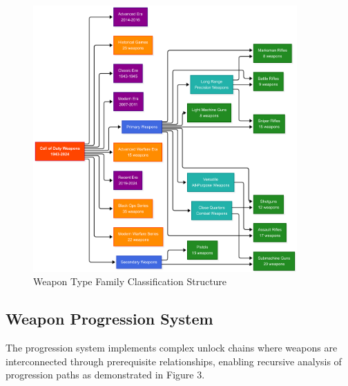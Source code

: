 \documentclass[12pt,a4paper]{article}
\begin{document}
\begin{figure}[H]
    \centering
    \includegraphics[width=0.9\textwidth]{../diagrams/weapon-type-family-classification-vertical.png}
    \caption{Weapon Type Family Classification Structure}
\end{figure}

\subsection{Weapon Progression System}

The progression system implements complex unlock chains where weapons are interconnected through prerequisite relationships, enabling recursive analysis of progression paths as demonstrated in Figure 3.
\end{document}
